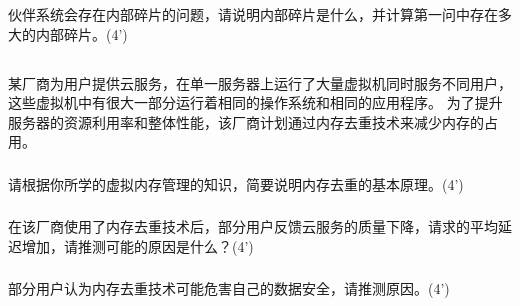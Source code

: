 \documentclass[a4paper,12pt]{article}
\newcommand{\score}[1]{(#1')}
\begin{document}
\begin{answer}
  \lipsum[3]
\end{answer}

\subsubsection{}

伙伴系统会存在内部碎片的问题，请说明内部碎片是什么，并计算第一问中存在多大的内部碎片。\score{4}

\begin{answer}
  \lipsum[3]
\end{answer}

\subsection{}

某厂商为用户提供云服务，在单一服务器上运行了大量虚拟机同时服务不同用户，这些虚拟机中有很大一部分运行着相同的操作系统和相同的应用程序。
为了提升服务器的资源利用率和整体性能，该厂商计划通过内存去重技术来减少内存的占用。

\subsubsection{}

请根据你所学的虚拟内存管理的知识，简要说明内存去重的基本原理。\score{4}

\begin{answer}
  \lipsum[3]
\end{answer}

\subsubsection{}

在该厂商使用了内存去重技术后，部分用户反馈云服务的质量下降，请求的平均延迟增加，请推测可能的原因是什么？\score{4}

\begin{answer}
  \lipsum[3]
\end{answer}

\subsubsection{}

部分用户认为内存去重技术可能危害自己的数据安全，请推测原因。\score{4}

\begin{answer}
  \lipsum[3]
\end{answer}
\end{document}
